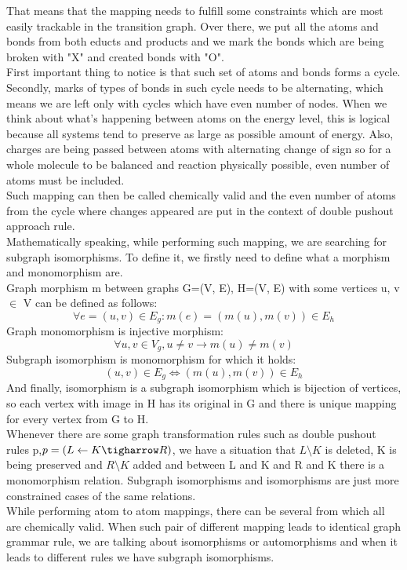 \documentclass[a4paper,10pt,titlepage]{report}
\begin{document}
That means that the mapping needs to fulfill some constraints which are most easily trackable in the transition graph. Over there, we put all the atoms and bonds from both educts and products and we mark the bonds which are being broken with "X" and created bonds with "O".
\\
First important thing to notice is that such set of atoms and bonds forms a cycle. Secondly, marks of types of bonds in such cycle needs to be alternating, which means we are left only with cycles which have even number of nodes. When we think about what's happening between atoms on the energy level, this is logical because all systems tend to preserve as large as possible amount of energy. Also, charges are being passed between atoms with alternating change of sign so for a whole molecule to be balanced and reaction physically possible, even number of atoms must be included.
\\
Such mapping can then be called chemically valid and the even number of atoms from the cycle where changes appeared are put in the context of double pushout approach rule.
\\
Mathematically speaking, while performing such mapping, we are searching for subgraph isomorphisms. To define it, we firstly need to define what a morphism and monomorphism are.
\\
Graph morphism m between graphs G=(V, E), H=(V, E) with some vertices u, v $\in$ V can be defined as follows:
\begin{equation}
    \forall e = (u,v) \in E_g : m(e) = (m(u),m(v)) \in E_h
\end{equation}
Graph monomorphism is injective morphism:
\begin{equation}
    \forall u,v \in V_g, u \neq v \rightarrow m(u) \neq m(v)
\end{equation}
Subgraph isomorphism is monomorphism for which it holds:
\begin{equation}
    (u,v) \in E_g \Leftrightarrow (m(u),m(v)) \in E_h
\end{equation}
And finally, isomorphism is a subgraph isomorphism which is bijection of vertices, so each vertex with image in H has its original in G and there is unique mapping for every vertex from G to H.
\\
Whenever there are some graph transformation rules such as  double pushout rules p,$ p=(L\leftarrow K \tigharrow R)$, we have a situation that $L\setminus K$ is deleted, K is being preserved and $R\setminus K$ added and between L and K and R and K there is a monomorphism relation. Subgraph isomorphisms and isomorphisms are just more constrained cases of the same relations. 
\\
While performing atom to atom mappings, there can be several from which all are chemically valid. When such pair of different mapping leads to identical graph grammar rule, we are talking about isomorphisms or automorphisms and when it leads to different rules we have subgraph isomorphisms. 
\end{document}
